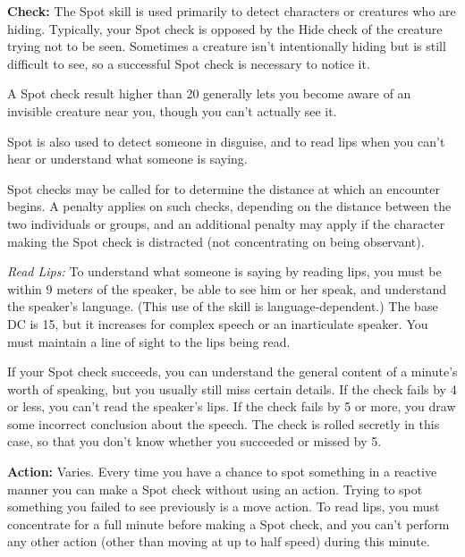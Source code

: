\textbf{Check:} The Spot skill is used primarily to detect characters or creatures who are hiding. Typically, your Spot check is opposed by the Hide check of the creature trying not to be seen. Sometimes a creature isn't intentionally hiding but is still difficult to see, so a successful Spot check is necessary to notice it.

A Spot check result higher than 20 generally lets you become aware of an invisible creature near you, though you can't actually see it.

Spot is also used to detect someone in disguise, and to read lips when you can't hear or understand what someone is saying.

Spot checks may be called for to determine the distance at which an encounter begins. A penalty applies on such checks, depending on the distance between the two individuals or groups, and an additional penalty may apply if the character making the Spot check is distracted (not concentrating on being observant).


\textit{Read Lips:} To understand what someone is saying by reading lips, you must be within 9 meters of the speaker, be able to see him or her speak, and understand the speaker's language. (This use of the skill is language-dependent.) The base DC is 15, but it increases for complex speech or an inarticulate speaker. You must maintain a line of sight to the lips being read.

If your Spot check succeeds, you can understand the general content of a minute's worth of speaking, but you usually still miss certain details. If the check fails by 4 or less, you can't read the speaker's lips. If the check fails by 5 or more, you draw some incorrect conclusion about the speech. The check is rolled secretly in this case, so that you don't know whether you succeeded or missed by 5.

\textbf{Action:} Varies. Every time you have a chance to spot something in a reactive manner you can make a Spot check without using an action. Trying to spot something you failed to see previously is a move action. To read lips, you must concentrate for a full minute before making a Spot check, and you can't perform any other action (other than moving at up to half speed) during this minute.

